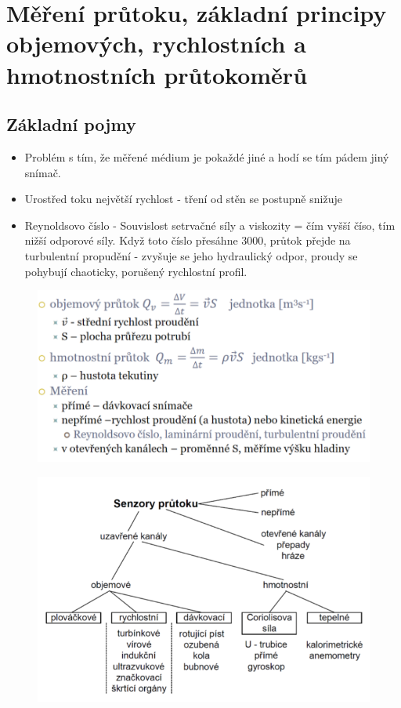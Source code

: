 \section{Měření průtoku, základní principy objemových, rychlostních a hmotnostních průtokoměrů}
\subsection*{Základní pojmy}
\begin{itemize}
    \item Problém s tím, že měřené médium je pokaždé jiné a hodí se tím pádem jiný snímač.
    \item Urostřed toku největší rychlost - tření od stěn se postupně snižuje
    \item Reynoldsovo číslo - Souvislost setrvačné síly a viskozity = čím vyšší číso, tím nižší odporové síly. Když toto číslo přesáhne 3000, průtok přejde na turbulentní propudění - zvyšuje se jeho hydraulický odpor, proudy se pohybují chaoticky, porušený rychlostní profil.
\end{itemize}
\begin{figure}[!h]
    \centering
    \includegraphics[scale = 0.8]{img/prutokZaklad.png}
\end{figure}

\begin{figure}[!h]
    \centering
    \includegraphics[scale = 1]{img/proudoverozdeleni.png}
\end{figure}

